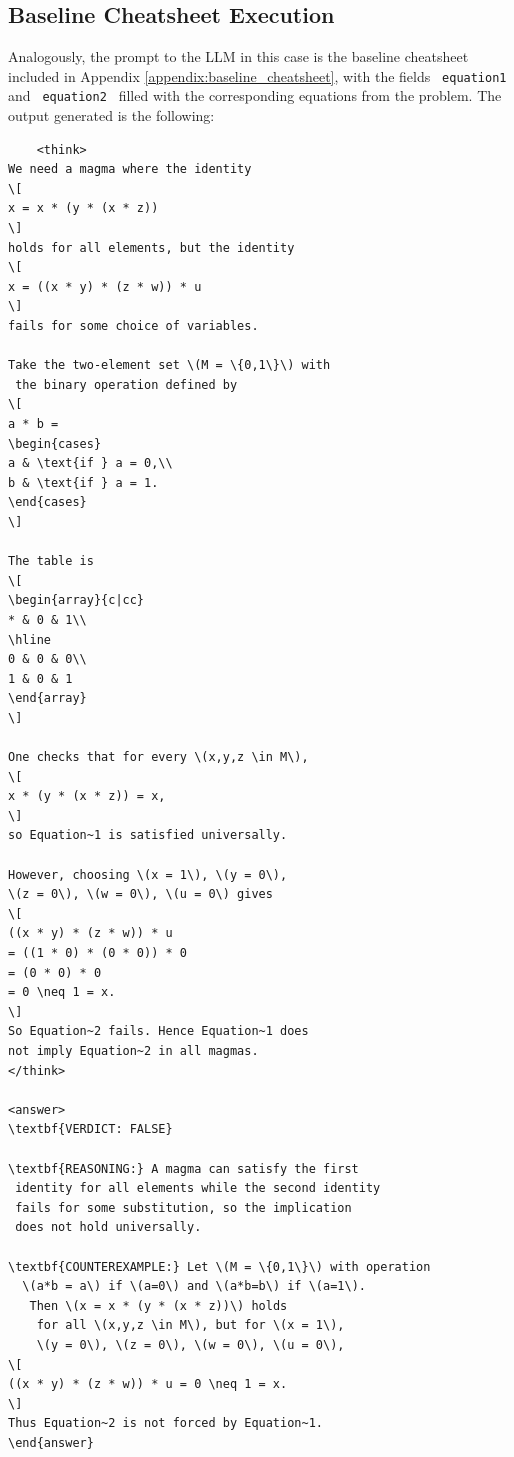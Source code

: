 \documentclass{article}
\begin{document}
\subsection{Baseline Cheatsheet Execution}

Analogously, the prompt to the LLM in this case is the baseline cheatsheet included in Appendix \ref{appendix:baseline_cheatsheet}, with the fields \texttt{{{  equation1  }}} and \texttt{{{ equation2 }}} filled with the corresponding equations from the problem. The output generated is the following:

\begin{verbatim}
    <think>
We need a magma where the identity
\[
x = x * (y * (x * z))
\]
holds for all elements, but the identity
\[
x = ((x * y) * (z * w)) * u
\]
fails for some choice of variables.

Take the two-element set \(M = \{0,1\}\) with 
 the binary operation defined by
\[
a * b =
\begin{cases}
a & \text{if } a = 0,\\
b & \text{if } a = 1.
\end{cases}
\]

The table is
\[
\begin{array}{c|cc}
* & 0 & 1\\
\hline
0 & 0 & 0\\
1 & 0 & 1
\end{array}
\]

One checks that for every \(x,y,z \in M\),
\[
x * (y * (x * z)) = x,
\]
so Equation~1 is satisfied universally.

However, choosing \(x = 1\), \(y = 0\), 
\(z = 0\), \(w = 0\), \(u = 0\) gives
\[
((x * y) * (z * w)) * u
= ((1 * 0) * (0 * 0)) * 0
= (0 * 0) * 0
= 0 \neq 1 = x.
\]
So Equation~2 fails. Hence Equation~1 does 
not imply Equation~2 in all magmas.
</think>

<answer>
\textbf{VERDICT: FALSE}

\textbf{REASONING:} A magma can satisfy the first
 identity for all elements while the second identity
 fails for some substitution, so the implication
 does not hold universally.

\textbf{COUNTEREXAMPLE:} Let \(M = \{0,1\}\) with operation
  \(a*b = a\) if \(a=0\) and \(a*b=b\) if \(a=1\).
   Then \(x = x * (y * (x * z))\) holds
    for all \(x,y,z \in M\), but for \(x = 1\),
    \(y = 0\), \(z = 0\), \(w = 0\), \(u = 0\),
\[
((x * y) * (z * w)) * u = 0 \neq 1 = x.
\]
Thus Equation~2 is not forced by Equation~1.
\end{answer}
\end{verbatim}
\newpage
\end{document}
